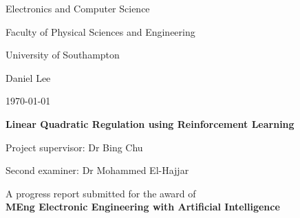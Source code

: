\documentclass[a4paper]{article}
\begin{document}
	
	\begin{titlepage}
		\vspace*{\fill}
		\begin{center}
		\centering
		{\Huge Electronics and Computer Science \par}
		{\Huge Faculty of Physical Sciences and Engineering \par}
		{\Huge University of Southampton \par}
		\hfill \break
		{\Large Daniel Lee \par}
		{\Large \today \par}
		\hfill \break
		{\huge\bfseries Linear Quadratic Regulation using Reinforcement Learning \par}
		\hfill \break
		{\Large Project supervisor: Dr Bing Chu \par}
		{\Large Second examiner: Dr Mohammed El-Hajjar \par}
		\hfill \break
		{\large A progress report submitted for the award of \\
			\bfseries MEng Electronic Engineering with Artificial Intelligence \par}
		\end{center}
		\vspace*{\fill}
	\end{titlepage}
	\pagebreak
	
	\tableofcontents
	
\end{document}
